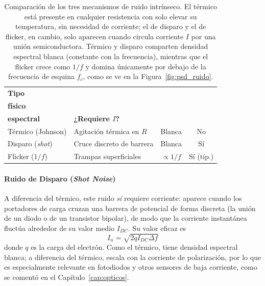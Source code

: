 \begin{table}
    \centering
    \begin{tabularx}{\linewidth}{@{}l>{\centering\arraybackslash}Xcc@{}}
        \toprule
        \textbf{Tipo} & \shortstack{\textbf{Origen}\\\textbf{físico}} & \shortstack{\textbf{Densidad}\\\textbf{espectral}} & \textbf{¿Requiere $I$?} \\
        \midrule
        Térmico (Johnson) & Agitación térmica en $R$ & Blanca & No \\
        Disparo (\textit{shot}) & Cruce discreto de barrera & Blanca & Sí \\
        Flicker ($1/f$) & Trampas superficiales & $\propto 1/f$ & Sí (típ.) \\
        \bottomrule
    \end{tabularx}
    \caption[Mecanismos de ruido intrínseco.]{Comparación de los tres mecanismos de ruido intrínseco. El térmico está presente en cualquier resistencia con solo elevar su temperatura, sin necesidad de corriente; el de disparo y el de flicker, en cambio, solo aparecen cuando circula corriente $I$ por una unión semiconductora. Térmico y disparo comparten densidad espectral blanca (constante con la frecuencia), mientras que el flicker crece como $1/f$ y domina únicamente por debajo de la frecuencia de esquina $f_c$, como se ve en la Figura~\ref{fig:psd_ruido}.\protect\label{tab:ruido_intrinseco}}
\end{table}

\paragraph{Ruido de Disparo (\textit{Shot Noise})}
A diferencia del térmico, este ruido \emph{sí} requiere corriente: aparece cuando los portadores de carga cruzan una barrera de potencial de forma discreta (la unión de un diodo o de un transistor bipolar), de modo que la corriente instantánea fluctúa alrededor de su valor medio $I_{DC}$. Su valor eficaz es
\begin{equation}\label{eq:shot_noise}
    I_n = \sqrt{2 q I_{DC} \Delta f}
\end{equation}
donde $q$ es la carga del electrón. Como el térmico, tiene densidad espectral blanca; a diferencia del térmico, escala con la corriente de polarización, por lo que es especialmente relevante en fotodiodos y otros sensores de baja corriente, como se comentó en el Capítulo~\ref{cap:opticos}.

